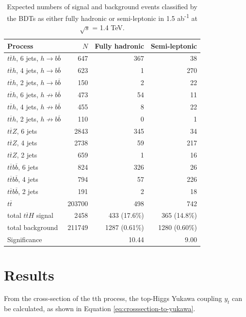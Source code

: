 \begin{table}[ht]
\centering
	\begin{tabular}{ l r r r }
	\hline \hline
	\textbf{Process} & \textbf{$N$} & \textbf{Fully hadronic} & \textbf{Semi-leptonic} \\ \hline
	$t\overline{t}h$, 6 jets, $h \rightarrow b\overline{b}$ & 647 & 367 & 38 \\
	$t\overline{t}h$, 4 jets, $h \rightarrow b\overline{b}$ & 623 & 1 & 270 \\ \hline
	$t\overline{t}h$, 2 jets, $h \rightarrow b\overline{b}$ & 150 & 2 & 22 \\

	$t\overline{t}h$, 6 jets, $h \not\rightarrow b\overline{b}$ & 473 & 54 & 11	 \\
	$t\overline{t}h$, 4 jets, $h \not\rightarrow b\overline{b}$ & 455 & 8 & 22\\
	$t\overline{t}h$, 2 jets, $h \not\rightarrow b\overline{b}$ & 110 & 0 & 1 \\

	$t\overline{t}Z$, 6 jets & 2843 & 345 & 34 \\
	$t\overline{t}Z$, 4 jets & 2738 & 59 & 217 \\
	$t\overline{t}Z$, 2 jets & 659 & 1 & 16 \\
	
	$t\overline{t}b\overline{b}$, 6 jets & 824 & 326 & 26 \\
	$t\overline{t}b\overline{b}$, 4 jets & 794 & 57 & 226 \\
	$t\overline{t}b\overline{b}$, 2 jets & 191 & 2 & 18 \\

	$t\overline{t}$ & 203700 & 498 & 742 \\ \hline

	total $t\overline{t}H$ signal & 2458 & 433 (17.6\%) & 365 (14.8\%) \\ 
	total background & 211749 & 1287 (0.61\%) & 1280 (0.60\%) \\
	Significance &   & 10.44 & 9.00 \\ \hline \hline

	\end{tabular}
	\caption{Expected numbers of signal and background events classified by the \acrshort{BDT}s as either fully hadronic or semi-leptonic in 1.5 ab\textsuperscript{-1} at $\sqrt{s}$ = 1.4 TeV.}
	\label{table:physics/SM/selections}
\end{table}

\section{Results}
From the cross-section of the tth process, the top-Higgs Yukawa coupling $y_t$ can be calculated, as shown in Equation \ref{eq:crosssection-to-yukawa}. 

